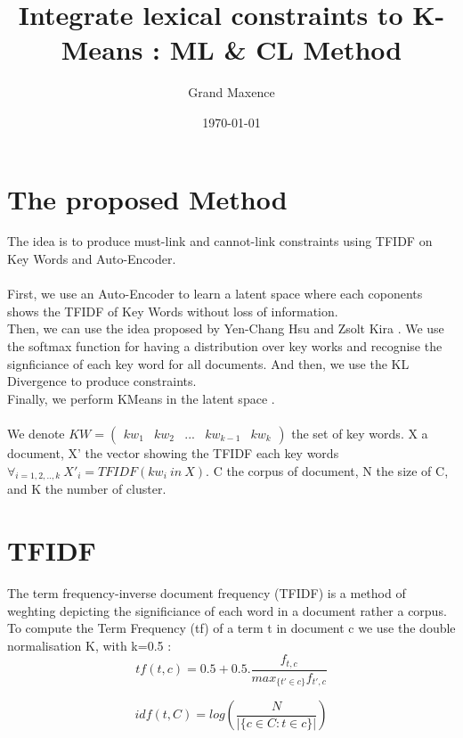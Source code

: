 \documentclass{article}
\title{Integrate lexical constraints to K-Means : ML \& CL Method}
\author{Grand Maxence}
\date{\today}
\begin{document}
\maketitle
\justify

\section{The proposed Method}

The idea is to produce must-link and cannot-link constraints using
TFIDF on Key Words and Auto-Encoder.\\ \\
First, we use an Auto-Encoder to learn a latent
space where each coponents shows the TFIDF of Key Words without
loss of information.\\Then, we can use the idea proposed
by Yen-Chang Hsu and Zsolt Kira \cite{2015arXiv151106321H}.
We use the softmax function for having a distribution over key works
and recognise the signficiance of each key word for all documents.
And then, we use the KL Divergence to produce constraints.\\Finally,
we perform KMeans in the latent space \cite{2016arXiv161004794Y}.
\\ \\
We denote $KW = \begin{pmatrix} kw_1 & kw_2 & ... & kw_{k-1} & kw_{k}
\end {pmatrix}$
the set of key words. X a document,
X' the vector showing the TFIDF each key words
$\forall_{i=1, 2, .., k}~X'_i =TFIDF(kw_i~in~X)$.
C the corpus of document, N the size of C, and K the number of cluster.

\section{TFIDF}

The term frequency-inverse document frequency (TFIDF) is a method of
weghting depicting the significiance of each word in a document rather
a corpus.
\\
To compute the Term Frequency (tf) of a term t in document c we use
the double normalisation K, with k=0.5 :  
\begin{equation}\label{eq:tf}
  tf(t, c) = 0.5 + 0.5.\frac{f_{t,c}}{max_{\{t' \in c \}}f_{t',c}}
\end{equation}

\begin{equation}\label{eq:idf}
  idf(t, C) = log(\frac{N}{| \{ c \in C : t \in c \}  |})
\end{equation}
\end{document}
